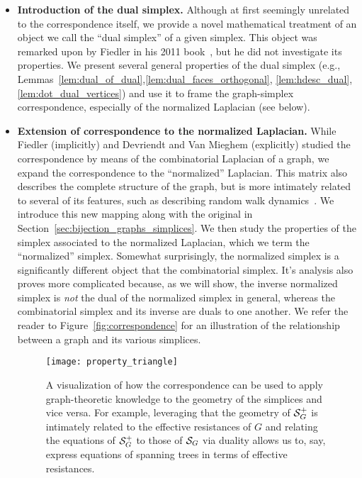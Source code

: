 \begin{itemize}
	\item {\bf Introduction of the dual simplex.} Although at first seemingly unrelated to the correspondence itself, we provide a  novel mathematical treatment of an object we call the ``dual simplex'' of a given simplex. This object was remarked upon by Fiedler in his 2011 book~\cite{fiedler2011matrices}, but he did not investigate its properties. We present several general properties of  the dual simplex (e.g., Lemmas~\ref{lem:dual_of_dual},\ref{lem:dual_faces_orthogonal},  \ref{lem:hdesc_dual}, \ref{lem:dot_dual_vertices}) and use it to frame the graph-simplex correspondence, especially of the normalized Laplacian (see below). 
	\item {\bf Extension of correspondence to the normalized Laplacian.}  While Fiedler (implicitly) and Devriendt and Van Mieghem (explicitly) studied the correspondence by means of the combinatorial Laplacian of a graph, we expand the correspondence to the ``normalized'' Laplacian.  This matrix also describes the complete structure of the graph, but is more intimately related to several of its features, such as describing random walk dynamics~\cite{chung1997spectral}. We introduce this new mapping  along with the original in Section~\ref{sec:bijection_graphs_simplices}. 
	We then study the properties of the simplex associated to the normalized Laplacian, which we term the ``normalized'' simplex.  
	Somewhat surprisingly, the normalized simplex is a significantly different object that the combinatorial  simplex. It's analysis  also proves more complicated because, as we will show, the inverse normalized simplex  is \emph{not} the dual of the normalized  simplex in general, whereas the combinatorial simplex and its inverse are duals to  one  another. 	 
	We refer  the reader to Figure~\ref{fig:correspondence} for an illustration of the relationship between a graph and its various simplices. 
	\begin{figure}
		\centering
		\texttt{[image: property\_triangle]}
		\caption{A visualization of how the correspondence can be used to apply graph-theoretic knowledge to the geometry  of the simplices and vice versa. For example, leveraging that the geometry of $\mathcal{S}_G^+$ is intimately related to the effective resistances of $G$ and relating the equations of $\mathcal{S}_G^+$  to those of $\mathcal{S}_G$ via duality allows us  to, say, express equations of spanning trees in terms of effective resistances.  }
		\label{fig:property_triangle}
	\end{figure}
	

\end{itemize}
